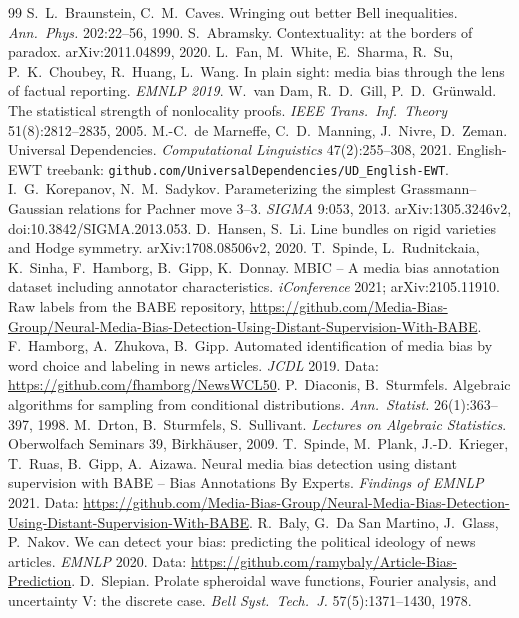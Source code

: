 \documentclass[11pt]{article}
\theoremstyle{definition}
\theoremstyle{remark}
\begin{document}
\begin{thebibliography}{99}
 S.~L.~Braunstein, C.~M.~Caves. Wringing out better Bell inequalities. \emph{Ann.\ Phys.} 202:22--56, 1990.
 S.~Abramsky. Contextuality: at the borders of paradox. arXiv:2011.04899, 2020.
 L.~Fan, M.~White, E.~Sharma, R.~Su, P.~K.~Choubey, R.~Huang, L.~Wang. In plain sight: media bias through the lens of factual reporting. \emph{EMNLP 2019}.
 W.~van Dam, R.~D.~Gill, P.~D.~Gr\"unwald. The statistical strength of nonlocality proofs. \emph{IEEE Trans.\ Inf.\ Theory} 51(8):2812--2835, 2005.
 M.-C.~de Marneffe, C.~D.~Manning, J.~Nivre, D.~Zeman. Universal Dependencies. \emph{Computational Linguistics} 47(2):255--308, 2021. English-EWT treebank: \texttt{github.com/UniversalDependencies/UD\_English-EWT}.
 I.~G.~Korepanov, N.~M.~Sadykov. Parameterizing the simplest Grassmann--Gaussian relations for Pachner move 3--3. \emph{SIGMA} 9:053, 2013. arXiv:1305.3246v2, doi:10.3842/SIGMA.2013.053.
 D.~Hansen, S.~Li. Line bundles on rigid varieties and Hodge symmetry. arXiv:1708.08506v2, 2020.
 T.~Spinde, L.~Rudnitckaia, K.~Sinha, F.~Hamborg, B.~Gipp, K.~Donnay. MBIC -- A media bias annotation dataset including annotator characteristics. \emph{iConference} 2021; arXiv:2105.11910. Raw labels from the BABE repository, \url{https://github.com/Media-Bias-Group/Neural-Media-Bias-Detection-Using-Distant-Supervision-With-BABE}.
 F.~Hamborg, A.~Zhukova, B.~Gipp. Automated identification of media bias by word choice and labeling in news articles. \emph{JCDL} 2019. Data: \url{https://github.com/fhamborg/NewsWCL50}.
 P.~Diaconis, B.~Sturmfels. Algebraic algorithms for sampling from conditional distributions. \emph{Ann.\ Statist.} 26(1):363--397, 1998.
 M.~Drton, B.~Sturmfels, S.~Sullivant. \emph{Lectures on Algebraic Statistics}. Oberwolfach Seminars 39, Birkh\"auser, 2009.
 T.~Spinde, M.~Plank, J.-D.~Krieger, T.~Ruas, B.~Gipp, A.~Aizawa. Neural media bias detection using distant supervision with BABE -- Bias Annotations By Experts. \emph{Findings of EMNLP} 2021. Data: \url{https://github.com/Media-Bias-Group/Neural-Media-Bias-Detection-Using-Distant-Supervision-With-BABE}.
 R.~Baly, G.~Da San Martino, J.~Glass, P.~Nakov. We can detect your bias: predicting the political ideology of news articles. \emph{EMNLP} 2020. Data: \url{https://github.com/ramybaly/Article-Bias-Prediction}.
 D.~Slepian. Prolate spheroidal wave functions, Fourier analysis, and uncertainty V: the discrete case. \emph{Bell Syst.\ Tech.\ J.} 57(5):1371--1430, 1978.

\end{thebibliography}
\end{document}
